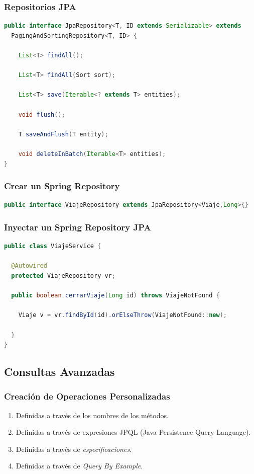 \documentclass[handout,a4paper,slidestop,xcolor=pst,blue]{beamer}
\begin{document}
\begin{frame}[c,fragile]
    \frametitle{Repositorios JPA}
    \begin{lstlisting}[basicstyle=\footnotesize,language=Java]
public interface JpaRepository<T, ID extends Serializable> extends
  PagingAndSortingRepository<T, ID> {

    List<T> findAll();

    List<T> findAll(Sort sort);

    List<T> save(Iterable<? extends T> entities);

    void flush();

    T saveAndFlush(T entity);

    void deleteInBatch(Iterable<T> entities);
}
    \end{lstlisting}
\end{frame}

\begin{frame}[c,fragile]
    \frametitle{Crear un Spring Repository}
\begin{lstlisting}[basicstyle=\small,language=Java]
public interface ViajeRepository extends JpaRepository<Viaje,Long>{}
\end{lstlisting}
\end{frame}

\begin{frame}[c,fragile]
    \frametitle{Inyectar un Spring Repository JPA}
\begin{lstlisting}[basicstyle=\footnotesize,language=Java]
public class ViajeService {
	
  @Autowired
  protected ViajeRepository vr;	

  public boolean cerrarViaje(Long id) throws ViajeNotFound {
		
    Viaje v = vr.findById(id).orElseThrow(ViajeNotFound::new);
		
  }
}
\end{lstlisting}
\end{frame}

\subsection{Consultas Avanzadas}

\begin{frame}[c]
    \frametitle{Creación de Operaciones Personalizadas}
    \begin{enumerate}[<+->]
        \item Definidas a través de los nombres de los métodos.
        \item Definidas a través de expresiones JPQL (Java Persistence Query Language).
        \item Definidas a través de \emph{especificaciones}.
        \item Definidas a través de \emph{Query By Example}.
    \end{enumerate}
\end{frame}
\end{document}
